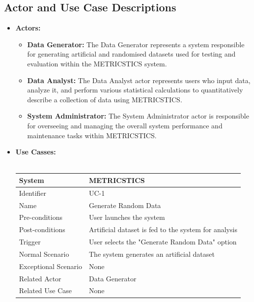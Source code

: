 \documentclass[letterpaper,12pt]{article}
\begin{document}
\subsection {Actor and Use Case Descriptions}
\begin{itemize}
    \item \textbf {Actors:}
    \begin{itemize}
\item\textbf {Data Generator:} The Data Generator represents a system responsible for generating artificial and randomised datasets used for testing and evaluation within the METRICSTICS system.
\item\textbf {Data Analyst:} The Data Analyst actor represents users who input data, analyze it, and perform various statistical calculations to quantitatively describe a collection of data using METRICSTICS.
\item\textbf {System Administrator:} The System Administrator actor is responsible for overseeing and managing the overall system performance and maintenance tasks within METRICSTICS. 
\end{itemize}
    \item \textbf {Use Casses:}\\
\\
\begin{tabular}{|p{1.45in}|p{3.65in}|}
   \hline
    System & METRICSTICS \\
    \hline
    Identifier & UC-1 \\
    \hline
    Name & Generate Random Data \\
    \hline
    Pre-conditions & User launches the system\\
   \hline
    Post-conditions & Artificial dataset is fed to the system for analysis\\
   \hline
    Trigger & User selects the "Generate Random Data" option \\
    \hline
    Normal Scenario & The system generates an artificial dataset \\
    \hline
    Exceptional Scenario & None \\
    \hline
    Related Actor& Data Generator\\
    \hline
    Related Use Case & None\\
\hline
\end{tabular}\\
\bigskip
\bigskip


\end{itemize}
\end{document}
